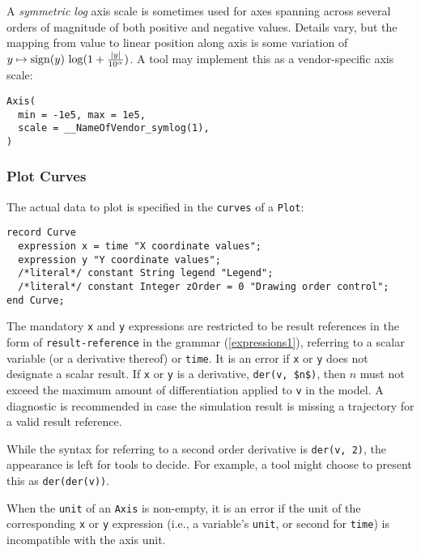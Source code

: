 \begin{example}
A \emph{symmetric log} axis scale is sometimes used for axes spanning across several orders of magnitude of both positive and negative values.
Details vary, but the mapping from value to linear position along axis is some variation of $y \mapsto \operatorname{sign}(y)\, \operatorname{log}(1 + \frac{\left\lvert y{} \right\rvert}{10^{\alpha}})$.
A tool may implement this as a vendor-specific axis scale:
\begin{lstlisting}[language=modelica]
Axis(
  min = -1e5, max = 1e5,
  scale = __NameOfVendor_symlog(1),
)
\end{lstlisting}
\end{example}

\subsubsection{Plot Curves}\label{plot-curves}

The actual data to plot is specified in the \lstinline!curves! of a \lstinline!Plot!:
\begin{lstlisting}[language=modelica]
record Curve
  expression x = time "X coordinate values";
  expression y "Y coordinate values";
  /*literal*/ constant String legend "Legend";
  /*literal*/ constant Integer zOrder = 0 "Drawing order control";
end Curve;
\end{lstlisting}

The mandatory \lstinline!x! and \lstinline!y! expressions are restricted to be result references in the form of \lstinline[language=grammar]!result-reference! in the grammar (\cref{expressions1}), referring to a scalar variable (or a derivative thereof) or \lstinline!time!.
It is an error if \lstinline!x! or \lstinline!y! does not designate a scalar result.
If \lstinline!x! or \lstinline!y! is a derivative, \lstinline!der(v, $n$)!, then $n$ must not exceed the maximum amount of differentiation applied to \lstinline!v! in the model.
A diagnostic is recommended in case the simulation result is missing a trajectory for a valid result reference.

\begin{nonnormative}
While the syntax for referring to a second order derivative is \lstinline!der(v, 2)!, the appearance is left for tools to decide.
For example, a tool might choose to present this as \lstinline!der(der(v))!.
\end{nonnormative}

When the \lstinline!unit! of an \lstinline!Axis! is non-empty, it is an error if the unit of the corresponding \lstinline!x! or \lstinline!y! expression (i.e., a variable's \lstinline!unit!, or second for \lstinline!time!) is incompatible with the axis unit.

